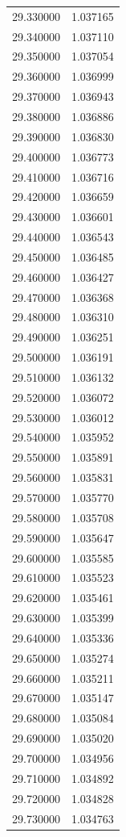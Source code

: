\begin{tabular}{rr}
29.330000 & 1.037165 \\
29.340000 & 1.037110 \\
29.350000 & 1.037054 \\
29.360000 & 1.036999 \\
29.370000 & 1.036943 \\
29.380000 & 1.036886 \\
29.390000 & 1.036830 \\
29.400000 & 1.036773 \\
29.410000 & 1.036716 \\
29.420000 & 1.036659 \\
29.430000 & 1.036601 \\
29.440000 & 1.036543 \\
29.450000 & 1.036485 \\
29.460000 & 1.036427 \\
29.470000 & 1.036368 \\
29.480000 & 1.036310 \\
29.490000 & 1.036251 \\
29.500000 & 1.036191 \\
29.510000 & 1.036132 \\
29.520000 & 1.036072 \\
29.530000 & 1.036012 \\
29.540000 & 1.035952 \\
29.550000 & 1.035891 \\
29.560000 & 1.035831 \\
29.570000 & 1.035770 \\
29.580000 & 1.035708 \\
29.590000 & 1.035647 \\
29.600000 & 1.035585 \\
29.610000 & 1.035523 \\
29.620000 & 1.035461 \\
29.630000 & 1.035399 \\
29.640000 & 1.035336 \\
29.650000 & 1.035274 \\
29.660000 & 1.035211 \\
29.670000 & 1.035147 \\
29.680000 & 1.035084 \\
29.690000 & 1.035020 \\
29.700000 & 1.034956 \\
29.710000 & 1.034892 \\
29.720000 & 1.034828 \\
29.730000 & 1.034763 \\

\end{tabular}
